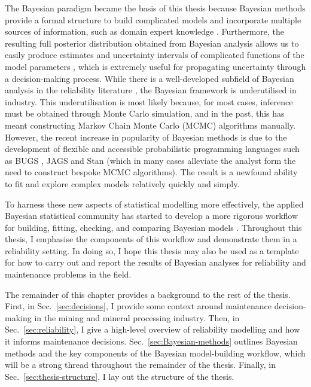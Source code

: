 The Bayesian paradigm became the basis of this thesis because Bayesian methods provide a formal structure to build complicated models and incorporate multiple sources of information, such as domain expert knowledge \citep{Meeker2022}. Furthermore, the resulting full posterior distribution obtained from Bayesian analysis allows us to easily produce estimates and uncertainty intervals of complicated functions of the model parameters \citep{Meeker2022}, which is extremely useful for propagating uncertainty through a decision-making process. While there is a well-developed subfield of Bayesian analysis in the reliability literature \citep{hamada2008, Meeker2022}, the Bayesian framework is underutilised in industry. This underutilisation is most likely because, for most cases, inference must be obtained through Monte Carlo simulation, and in the past, this has meant constructing Markov Chain Monte Carlo (MCMC) algorithms manually. However, the recent increase in popularity of Bayesian methods is due to the development of flexible and accessible probabilistic programming languages such as BUGS \citep{lunn2012}, JAGS \citep{plummer2003} and Stan \citep{Stan2022} (which in many cases alleviate the analyst form the need to construct bespoke MCMC algorithms). The result is a newfound ability to fit and explore complex models relatively quickly and simply.

To harness these new aspects of statistical modelling more effectively, the applied Bayesian statistical community has started to develop a more rigorous workflow for building, fitting, checking, and comparing Bayesian models \citep{gelman_workflow_2020}. Throughout this thesis, I emphasise the components of this workflow and demonstrate them in a reliability setting. In doing so, I hope this thesis may also be used as a template for how to carry out and report the results of Bayesian analyses for reliability and maintenance problems in the field.

The remainder of this chapter provides a background to the rest of the thesis. First, in Sec.~\ref{sec:decisions}, I provide some context around maintenance decision-making in the mining and mineral processing industry. Then, in Sec.~\ref{sec:reliability}, I give a high-level overview of reliability modelling and how it informs maintenance decisions. Sec.~\ref{sec:Bayesian-methods} outlines Bayesian methods and the key components of the Bayesian model-building workflow, which will be a strong thread throughout the remainder of the thesis. Finally, in Sec.~\ref{sec:thesis-structure}, I lay out the structure of the thesis.

